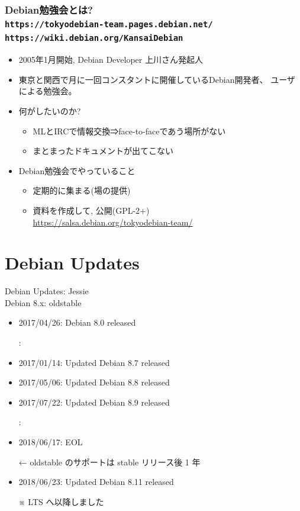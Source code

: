 \documentclass[cjk,c,squeeze,shrink,dvipdfmx,12pt]{beamer}
\begin{document}
\begin{frame}
  \frametitle{Debian勉強会とは?%
    \\[-.5em]{\normalsize{\texttt{https://tokyodebian-team.pages.debian.net/}}}%
    \\[-.5em]{\normalsize{\texttt{https://wiki.debian.org/KansaiDebian}}}%
  }
  \pause
  \begin{itemize}[<+->]
  \item
    2005年1月開始, Debian Developer 上川さん発起人
  \item
    東京と関西で月に一回コンスタントに開催しているDebian開発者、
    ユーザによる勉強会。
  \item
    何がしたいのか?
    \begin{itemize}[<+->]
    \item
      MLとIRCで情報交換⇒face-to-faceであう場所がない
    \item
      まとまったドキュメントが出てこない
    \end{itemize}
  \item
    Debian勉強会でやっていること
    \begin{itemize}[<+->]
    \item
      定期的に集まる(場の提供)
    \item
      資料を作成して, 公開(GPL-2+) \\
      {\small \url{https://salsa.debian.org/tokyodebian-team/}}
    \end{itemize}
  \end{itemize}

\end{frame}


\section{Debian Updates}

\begin{frame}[fragile]{%
    Debian Updates: Jessie%
    \\[-.5em]{\normalsize{Debian 8.x: oldstable}}
  }
  \pause
  \begin{itemize}[<+->]
  \item 2017/04/26: Debian 8.0 released
  \item[] :
  \item 2017/01/14: Updated Debian 8.7 released
  \item 2017/05/06: Updated Debian 8.8 released
  \item 2017/07/22: Updated Debian 8.9 released
  \item[] :
  \item \alert{2018/06/17: EOL}
  \item[←] oldstable のサポートは stable リリース後 1 年
  \item 2018/06/23: Updated Debian 8.11 released
  \item[※] LTS へ以降しました
  \end{itemize}
\end{frame}
\end{document}

